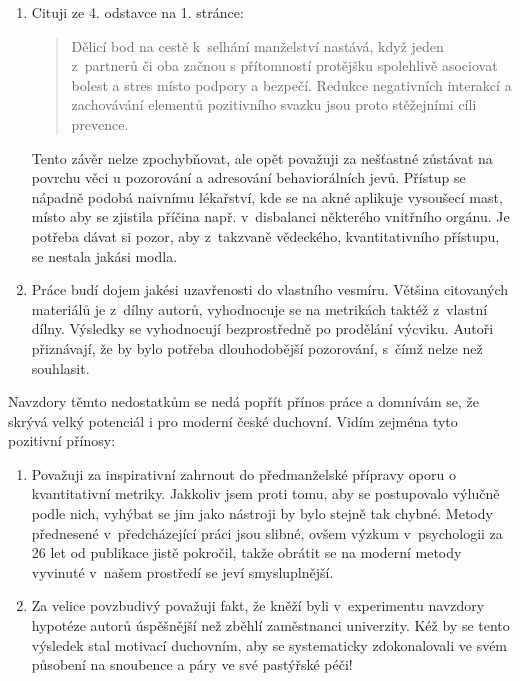 \begin{enumerate}
  \item{
    Cituji ze 4. odstavce na 1. stránce:
    \begin{quote}
      Dělicí bod na cestě k~selhání manželství nastává, když jeden z~partnerů
      či oba začnou s přítomností protějšku spolehlivě asociovat bolest a stres
      místo podpory a bezpečí. Redukce negativních interakcí a zachovávání
      elementů pozitivního svazku jsou proto stěžejními cíli prevence.
    \end{quote}
    Tento závěr nelze zpochybňovat, ale opět považuji za nešťastné zůstávat na
    povrchu věci u pozorování a adresování behaviorálních jevů. Přístup se
    nápadně podobá naivnímu lékařství, kde se na akné aplikuje vysoušecí mast,
    místo aby se zjistila příčina např. v~disbalanci některého vnitřního orgánu.
    Je potřeba dávat si pozor, aby z~takzvaně vědeckého, kvantitativního
    přístupu, se nestala jakási modla.
  }

  \item{
    Práce budí dojem jakési uzavřenosti do vlastního vesmíru. Většina
    citovaných materiálů je z~dílny autorů, vyhodnocuje se na metrikách taktéž
    z~vlastní dílny. Výsledky se vyhodnocují bezprostředně po prodělání výcviku.
    Autoři přiznávají, že by bylo potřeba dlouhodobější pozorování, s~čímž nelze
    než souhlasit.
  }
\end{enumerate}

Navzdory těmto nedostatkům se nedá popřít přínos práce a domnívám se, že skrývá
velký potenciál i pro moderní české duchovní. Vidím zejména tyto pozitivní
přínosy:

\begin{enumerate}
  \item{
    Považuji za inspirativní zahrnout do předmanželské přípravy oporu o
    kvantitativní metriky. Jakkoliv jsem proti tomu, aby se postupovalo výlučně
    podle nich, vyhýbat se jim jako nástroji by bylo stejně tak chybné. Metody
    přednesené v~předcházející práci jsou slibné, ovšem výzkum
    v~psychologii za 26 let od publikace jistě pokročil, takže obrátit se na
    moderní metody vyvinuté v~našem prostředí se jeví smysluplnější.
  }

  \item{
    Za velice povzbudivý považuji fakt, že kněží byli v~experimentu navzdory
    hypotéze autorů úspěšnější než zběhlí zaměstnanci univerzity. Kéž by se
    tento výsledek stal motivací duchovním, aby se systematicky zdokonalovali ve
    svém působení na snoubence a páry ve své pastýřské péči!
  }
\end{enumerate}

